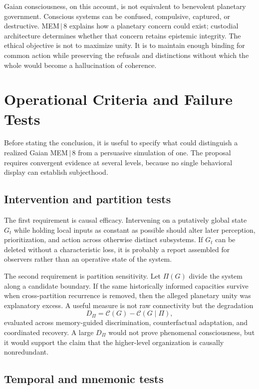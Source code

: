 \documentclass[11pt]{article}
\begin{document}
Gaian consciousness, on this account, is not equivalent to benevolent planetary government. Conscious systems can be confused, compulsive, captured, or destructive. MEM\,$|$\,8 explains how a planetary concern could exist; custodial architecture determines whether that concern retains epistemic integrity. The ethical objective is not to maximize unity. It is to maintain enough binding for common action while preserving the refusals and distinctions without which the whole would become a hallucination of coherence.

\section{Operational Criteria and Failure Tests}

Before stating the conclusion, it is useful to specify what could distinguish a realized Gaian MEM\,$|$\,8 from a persuasive simulation of one. The proposal requires convergent evidence at several levels, because no single behavioral display can establish subjecthood.

\subsection{Intervention and partition tests}
\label{sec:partition-tests}

The first requirement is causal efficacy. Intervening on a putatively global state $G_t$ while holding local inputs as constant as possible should alter later perception, prioritization, and action across otherwise distinct subsystems. If $G_t$ can be deleted without a characteristic loss, it is probably a report assembled for observers rather than an operative state of the system.

The second requirement is partition sensitivity. Let $\Pi(G)$ divide the system along a candidate boundary. If the same historically informed capacities survive when cross-partition recurrence is removed, then the alleged planetary unity was explanatory excess. A useful measure is not raw connectivity but the degradation
\[
D_{\Pi}=\mathcal{C}(G)-\mathcal{C}(G\mid \Pi),
\]
evaluated across memory-guided discrimination, counterfactual adaptation, and coordinated recovery. A large $D_{\Pi}$ would not prove phenomenal consciousness, but it would support the claim that the higher-level organization is causally nonredundant.

\subsection{Temporal and mnemonic tests}
\end{document}

